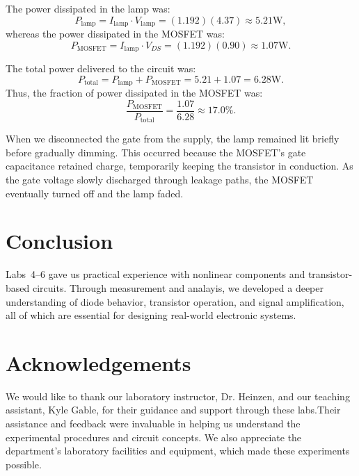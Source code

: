 \documentclass{article}
\begin{document}
\noindent The power dissipated in the lamp was:
\begin{equation}
    P_{\text{lamp}} = I_{\text{lamp}} \cdot V_{\text{lamp}} 
    = (1.192)(4.37) \approx 5.21\si{\watt},
\end{equation}
whereas the power dissipated in the MOSFET was:
\begin{equation}
    P_{\text{MOSFET}} = I_{\text{lamp}} \cdot V_{DS} 
    = (1.192)(0.90) \approx 1.07\si{\watt}.
\end{equation}

\noindent The total power delivered to the circuit was:
\begin{equation}
    P_{\text{total}} = P_{\text{lamp}} + P_{\text{MOSFET}} 
    = 5.21 + 1.07 = 6.28\si{\watt}.
\end{equation}
Thus, the fraction of power dissipated in the MOSFET was:
\begin{equation}
    \frac{P_{\text{MOSFET}}}{P_{\text{total}}} 
    = \frac{1.07}{6.28} \approx 17.0\%.
\end{equation}

\noindent When we disconnected the gate from the supply, the lamp remained lit briefly 
before gradually dimming. This occurred because the MOSFET’s gate capacitance retained charge, 
temporarily keeping the transistor in conduction. As the gate voltage slowly discharged through leakage paths, 
the MOSFET eventually turned off and the lamp faded.

\section*{Conclusion}

Labs~4--6 gave us practical experience with nonlinear components and transistor-
based circuits. Through measurement and analayis, we developed a deeper understanding
of diode behavior, transistor operation, and signal amplification, all of which are
essential for designing real-world electronic systems.


\section*{Acknowledgements}

We would like to thank our laboratory instructor, Dr. Heinzen, and our teaching 
assistant, Kyle Gable, for their guidance and support through these labs.Their 
assistance and feedback were invaluable in helping us understand the experimental 
procedures and circuit concepts. We also appreciate the department's laboratory 
facilities and equipment, which made these experiments possible.
\end{document}
